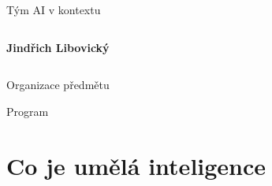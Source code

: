 \documentclass[aspectratio=169,dvipsnames]{beamer}
\begin{document}
\begin{frame}{Tým AI v kontextu}
\begin{columns}
    \end{columns}

    \hspace*{40pt}\begin{columns}
        \column{30pt}
        \textbf{Jindřich Libovický}

    \end{columns}

\end{frame}


\begin{frame}{Organizace předmětu}
\end{frame}

\begin{frame}{Program}
\end{frame}

\section{Co je umělá inteligence}
\end{document}

